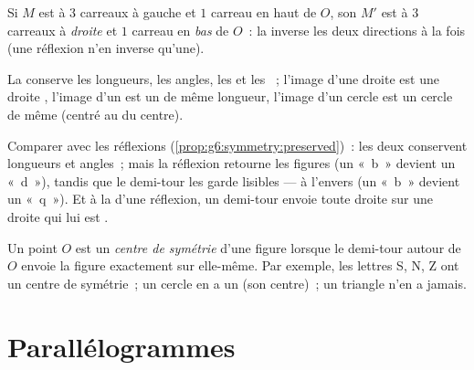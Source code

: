 \begin{example}\label{ex:g7:central:grid}
Si $M$ est à $3$ carreaux à gauche et $1$ carreau en haut de $O$, son
 $M'$ est à $3$ carreaux à \emph{droite} et $1$ carreau en
\emph{bas} de $O$~: la  inverse les deux directions
à la fois (une réflexion n'en inverse qu'une).
\end{example}

\begin{proposition}\label{prop:g7:central:preserved}
La  conserve les longueurs, les angles, les
 et les ~; l'image d'une droite est une droite
\emph{}, l'image d'un  est un   de
même longueur, l'image d'un cercle est un cercle de même  (centré
au  du centre).
\end{proposition}
\admitted

\begin{remark}
Comparer avec les réflexions (\cref{prop:g6:symmetry:preserved})~: les
deux conservent longueurs et angles~; mais la réflexion retourne les
figures (un «~b~» devient un «~d~»), tandis que le demi-tour les
garde lisibles --- à l'envers (un «~b~» devient un «~q~»). Et à la
 d'une réflexion, un demi-tour envoie toute droite sur une
droite qui lui est .
\end{remark}

\begin{definition}\label{def:g7:central:center}
Un point $O$ est un \emph{centre de
symétrie} d'une figure lorsque le demi-tour
autour de $O$ envoie la figure exactement sur elle-même. Par exemple,
les lettres S, N, Z ont un centre de symétrie~; un cercle en a un (son
centre)~; un triangle n'en a jamais.
\end{definition}

\section{Parallélogrammes}

